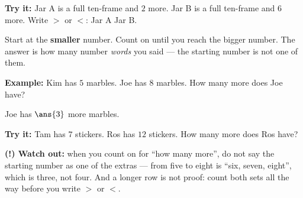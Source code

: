 \documentclass[12pt]{article}
\begin{document}
\begin{tryitbox}
\textbf{Try it:} Jar A is a full ten-frame and $2$ more. Jar B is a full
ten-frame and $6$ more. Write $>$ or $<$: \; Jar A \underline{\hspace{0.9cm}}
Jar B.\\[2pt]
\end{tryitbox}


\begin{formulabox}
Start at the \textbf{smaller} number. Count on until you reach the bigger
number. The answer is how many number \emph{words} you said --- the starting
number is not one of them.
\end{formulabox}

\begin{examplebox}
\textbf{Example:} Kim has $5$ marbles. Joe has $8$ marbles. How many more does
Joe have?

Joe has $\ans{3}$ more marbles.
\end{examplebox}

\begin{tryitbox}
\textbf{Try it:} Tam has $7$ stickers. Ros has $12$ stickers. How many more
does Ros have?\\[2pt]
\end{tryitbox}

\begin{watchoutbox}
\textbf{(!) Watch out:} when you count on for ``how many more'', do not say the
starting number as one of the extras --- from five to eight is
``six, seven, eight'', which is three, not four. And a longer row is not
proof: count both sets all the way before you write $>$ or $<$.
\end{watchoutbox}
\end{document}
